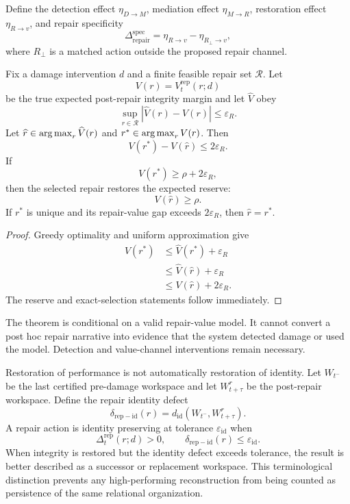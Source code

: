 Define the detection effect \(\eta_{D\to M}\), mediation effect
\(\eta_{M\to R}\), restoration effect \(\eta_{R\to v}\), and repair
specificity
\[
\Delta_{\mathrm{repair}}^{\mathrm{spec}}
=
\eta_{R\to v}
-
\eta_{R_\perp\to v},
\]
where \(R_\perp\) is a matched action outside the proposed repair channel.


\begin{theorem}
\label{thm:repair-selection}
Fix a damage intervention \(d\) and a finite feasible repair set
\(\mathcal R\). Let
\[
V(r)=V_t^{\mathrm{rep}}(r;d)
\]
be the true expected post-repair integrity margin and let \(\widehat V\) obey
\[
\sup_{r\in\mathcal R}|\widehat V(r)-V(r)|
\leq
\varepsilon_R.
\]
Let \(\widehat r\in\operatorname*{arg\,max}_r\widehat V(r)\) and
\(r^*\in\operatorname*{arg\,max}_r V(r)\). Then
\[
\boxed{
V(r^*)-V(\widehat r)
\leq
2\varepsilon_R.
}
\]
If
\[
V(r^*)
\geq
\rho+2\varepsilon_R,
\]
then the selected repair restores the expected reserve:
\[
\boxed{V(\widehat r)\geq\rho.}
\]
If \(r^*\) is unique and its repair-value gap exceeds
\(2\varepsilon_R\), then \(\widehat r=r^*\).
\end{theorem}

\begin{proof}
Greedy optimality and uniform approximation give
\[
\begin{aligned}
V(r^*)
&\leq
\widehat V(r^*)+\varepsilon_R\\
&\leq
\widehat V(\widehat r)+\varepsilon_R\\
&\leq
V(\widehat r)+2\varepsilon_R.
\end{aligned}
\]
The reserve and exact-selection statements follow immediately.
\end{proof}

The theorem is conditional on a valid repair-value model. It cannot convert a
post hoc repair narrative into evidence that the system detected damage or
used the model. Detection and value-channel interventions remain necessary.


Restoration of performance is not automatically restoration of identity. Let
\(W_{t^-}\) be the last certified pre-damage workspace and let
\(W_{t+\tau}^{r}\) be the post-repair workspace. Define the repair identity
defect
\[
\delta_{\mathrm{rep-id}}(r)
=
 d_{\mathrm{id}}
\left(
W_{t^-},W_{t+\tau}^{r}
\right).
\]
A repair action is identity preserving at tolerance
\(\varepsilon_{\mathrm{id}}\) when
\[
\Delta_t^{\mathrm{rep}}(r;d)>0,
\qquad
\delta_{\mathrm{rep-id}}(r)
\leq
\varepsilon_{\mathrm{id}}.
\]
When integrity is restored but the identity defect exceeds tolerance, the
result is better described as a successor or replacement workspace. This
terminological distinction prevents any high-performing reconstruction from
being counted as persistence of the same relational organization.

